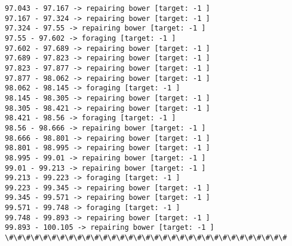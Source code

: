 \documentclass[11pt]{article}
\begin{document}
\begin{Verbatim}[commandchars=\\\{\}]
97.043 - 97.167 -> repairing bower [target: -1 ]
97.167 - 97.324 -> repairing bower [target: -1 ]
97.324 - 97.55 -> repairing bower [target: -1 ]
97.55 - 97.602 -> foraging [target: -1 ]
97.602 - 97.689 -> repairing bower [target: -1 ]
97.689 - 97.823 -> repairing bower [target: -1 ]
97.823 - 97.877 -> repairing bower [target: -1 ]
97.877 - 98.062 -> repairing bower [target: -1 ]
98.062 - 98.145 -> foraging [target: -1 ]
98.145 - 98.305 -> repairing bower [target: -1 ]
98.305 - 98.421 -> repairing bower [target: -1 ]
98.421 - 98.56 -> foraging [target: -1 ]
98.56 - 98.666 -> repairing bower [target: -1 ]
98.666 - 98.801 -> repairing bower [target: -1 ]
98.801 - 98.995 -> repairing bower [target: -1 ]
98.995 - 99.01 -> repairing bower [target: -1 ]
99.01 - 99.213 -> repairing bower [target: -1 ]
99.213 - 99.223 -> foraging [target: -1 ]
99.223 - 99.345 -> repairing bower [target: -1 ]
99.345 - 99.571 -> repairing bower [target: -1 ]
99.571 - 99.748 -> foraging [target: -1 ]
99.748 - 99.893 -> repairing bower [target: -1 ]
99.893 - 100.105 -> repairing bower [target: -1 ]
\#\#\#\#\#\#\#\#\#\#\#\#\#\#\#\#\#\#\#\#\#\#\#\#\#\#\#\#\#\#\#\#\#



\end{Verbatim}
\end{document}
